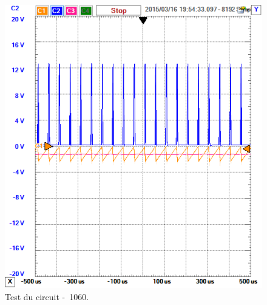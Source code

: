 \begin{figure}[ht]
	\centering
	\includegraphics[scale=0.7]{img/circuit-test-1060mv.png}
	\caption{Test du circuit \unit{-1060}{\milli\volt}.}
	\label{fig:test-1060}
\end{figure}

